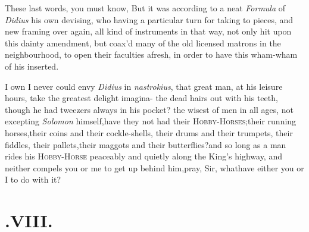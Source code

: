 \documentclass{article}
\begin{document}
These last words, you must know,\break
{} 
 But
it was according to a neat \textit{Formula} of \textit{Didius} his own devising, who
having 
a particular turn for taking to pieces,\break
and new framing over again, all kind of\break
instruments in that way, not only hit\break
upon this dainty amendment, but coax’d\break
many of the old licensed matrons in the\break
neighbourhood, to open their faculties\break
afresh, in order to have this wham-wham\break
of his inserted.

I own I never could envy \textit{Didius} in
\textit{nastrokius}, that great man, at his leisure hours, take the
greatest delight imagina-
the dead hairs out with his teeth, though he had tweezers always in
his pocket?
 the wisest of
men in all ages, not excepting \textit{Solomon} himself,\tsk  have
they not had their
\textsc{Hobby-Horses};\tsk  their running
horses,\tsk  their coins and their cockle-shells, their drums and
their trumpets, their fiddles, their pallets,\tsk  their maggots
and their butterflies?\tsk  and so long as a man rides his
\textsc{Hobby-Horse} peaceably and quietly
along the King’s highway, and neither compels you or me to
get up behind him,\tsh  pray, Sir, what\break have either you or I to do
with it?

\null
\section{.\enspace VIII.}
\end{document}
